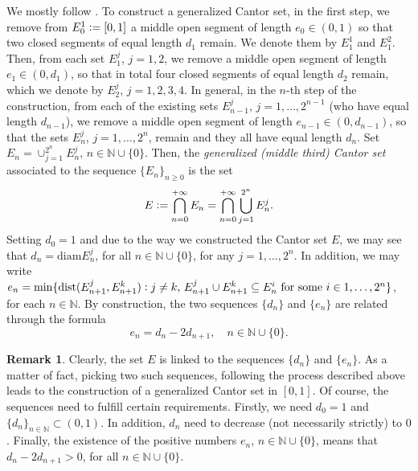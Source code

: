 \documentclass[12pt]{amsart}
\theoremstyle{definition}\newtheorem{remark}[theorem]{Remark}
\theoremstyle{definition}\newtheorem{example}[theorem]{Example}
\theoremstyle{definition}\newtheorem{definition}{Definition}
\numberwithin{equation}{section}
\begin{document}
We mostly follow \cite[Section 2.3]{Primer}. To construct a generalized Cantor set, in the first step, we remove from $E_0^1\vcentcolon=[0,1]$ a middle open segment of length $e_0\in(0,1)$ so that two closed segments of equal length $d_1$ remain. We denote them by $E_1^1$ and $E_1^2$. Then, from each set $E_1^j$, $j=1,2$, we remove a middle open segment of length $e_1\in(0,d_1)$, so that in total four closed segments of equal length $d_2$ remain, which we denote by $E_2^j$, $j=1,2,3,4$. In general, in the $n$-th step of the construction, from each of the existing sets $E_{n-1}^j$, $j=1,\dots,2^{n-1}$ (who have equal length $d_{n-1}$), we remove a middle open segment of length $e_{n-1}\in(0,d_{n-1})$, so that the sets $E_n^j$, $j=1,\dots,2^n$, remain and they all have equal length $d_n$. Set $E_n=\cup_{j=1}^{2^n}E_n^j$, $n\in\mathbb{N}\cup\{0\}$. Then, the \textit{generalized (middle third) Cantor set} associated to the sequence $\{E_n\}_{n\ge0}$ is the set 
\begin{equation*}
    E\vcentcolon=\bigcap_{n=0}^{+\infty}E_n=\bigcap_{n=0}^{+\infty}\bigcup_{j=1}^{2^n}E_n^j. 
\end{equation*}
Setting $d_0=1$ and due to the way we constructed the Cantor set $E$, we may see that $d_n=\mathrm{diam}E_n^j$, for all $n\in\mathbb{N}\cup\{0\}$, for any $j=1,\dots,2^n$. In addition, we may write $e_n=\min\{\mathrm{dist}(E_{n+1}^j,E_{n+1}^k)\vcentcolon j\ne k, \,E_{n+1}^j\cup E_{n+1}^k\subseteq E_n^i\text{ for some } i\in1,\dots,2^n\}$, for each $n\in\mathbb{N}$. By construction, the two sequences $\{d_n\}$ and $\{e_n\}$ are related through the formula
\begin{equation}\label{eq:cantor sequences}
  e_n=d_n-2d_{n+1}, \quad n\in\mathbb{N}\cup\{0\}.
\end{equation}

\begin{remark}\label{rem:cantor}
Clearly, the set $E$ is linked to the sequences $\{d_n\}$ and $\{e_n\}$. As a matter of fact, picking two such sequences, following the process described above leads to the construction of a generalized Cantor set in $[0,1]$. Of course, the sequences need to fulfill certain requirements. Firstly, we need $d_0=1$ and $\{d_n\}_{n\in\mathbb{N}}\subset(0,1)$. In addition, $d_n$ need to decrease (not necessarily strictly) to $0$. Finally, the existence of the positive numbers $e_n$, $n\in\mathbb{N}\cup\{0\}$, means that $d_n-2d_{n+1}>0$, for all $n\in\mathbb{N}\cup\{0\}$.
\end{remark}
\end{document}
